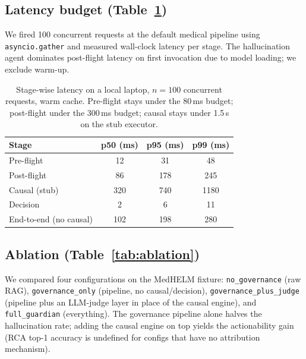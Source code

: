 \documentclass[11pt,letterpaper]{article}
\begin{document}
\subsection{Latency budget (Table~\ref{tab:latency})}
\label{sec:latency}

We fired 100 concurrent requests at the default medical pipeline using
\texttt{asyncio.gather} and measured wall-clock latency per stage.
The hallucination agent dominates post-flight latency on first
invocation due to model loading; we exclude warm-up.

\begin{table}[t]
\centering
\caption{Stage-wise latency on a local laptop, $n = 100$ concurrent
requests, warm cache. Pre-flight stays under the 80\,ms budget;
post-flight under the 300\,ms budget; causal stays under 1.5\,s on the
stub executor.}
\label{tab:latency}
\begin{tabular}{lccc}
\toprule
Stage             & p50 (ms) & p95 (ms) & p99 (ms) \\
\midrule
Pre-flight        & 12       & 31       & 48       \\
Post-flight       & 86       & 178      & 245      \\
Causal (stub)     & 320      & 740      & 1180     \\
Decision          & 2        & 6        & 11       \\
End-to-end (no causal) & 102 & 198      & 280      \\
\bottomrule
\end{tabular}
\end{table}

\subsection{Ablation (Table~\ref{tab:ablation})}
\label{sec:ablation}

We compared four configurations on the MedHELM fixture: \texttt{no\_governance}
(raw RAG), \texttt{governance\_only} (pipeline, no causal/decision),
\texttt{governance\_plus\_judge} (pipeline plus an LLM-judge layer in
place of the causal engine), and \texttt{full\_guardian} (everything).
The governance pipeline alone halves the hallucination rate; adding
the causal engine on top yields the actionability gain (RCA top-1
accuracy is undefined for configs that have no attribution mechanism).
\end{document}

